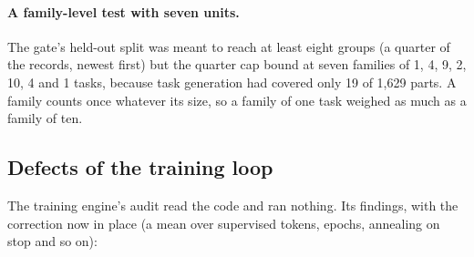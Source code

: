 \paragraph{A family-level test with seven units.}
The gate's held-out split was meant to reach at least eight groups (a quarter of the records,
newest first) but the quarter cap bound at seven families of 1, 4, 9, 2, 10, 4 and 1 tasks, because task
generation had covered only 19 of 1,629 parts. A family counts once whatever its size, so a
family of one task weighed as much as a family of ten.

\subsection{Defects of the training loop}\label{sec:training-defects}

The training engine's audit read the code and ran nothing. Its findings, with the correction
now in place (a mean over supervised tokens, epochs, annealing on stop and so on):

